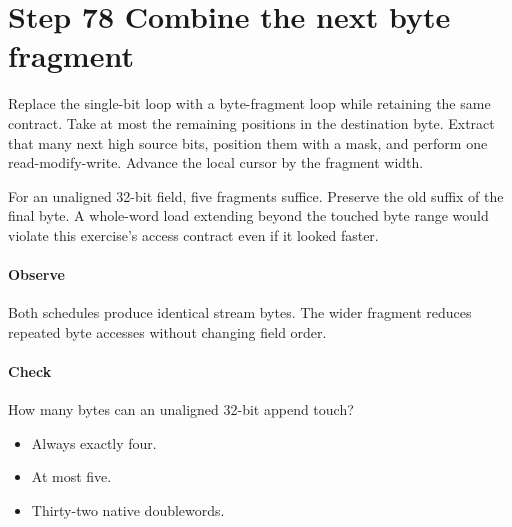\section{Step 78 Combine the next byte fragment}\label{h263-writer-s08}
Replace the single-bit loop with a byte-fragment loop while retaining the same
contract. Take at most the remaining positions in the destination byte. Extract
that many next high source bits, position them with a mask, and perform one
read-modify-write. Advance the local cursor by the fragment width.

For an unaligned 32-bit field, five fragments suffice. Preserve the old suffix
of the final byte. A whole-word load extending beyond the touched byte range
would violate this exercise's access contract even if it looked faster.

\paragraph{Observe} Both schedules produce identical stream bytes. The wider
fragment reduces repeated byte accesses without changing field order.
\paragraph{Check} How many bytes can an unaligned 32-bit append touch?
\begin{itemize}
  \item[A.] Always exactly four.
  \item[B.] At most five.
  \item[C.] Thirty-two native doublewords.
\end{itemize}
